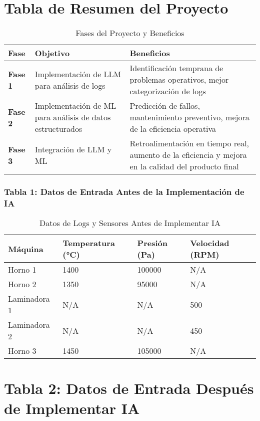 \section{Tabla de Resumen del Proyecto}

\begin{table}[htbp]
\centering
\caption{Fases del Proyecto y Beneficios}
\label{tab:resumen-proyecto}
\begin{tabularx}{\textwidth}{|X|X|X|}
\hline
\textbf{Fase} & \textbf{Objetivo} & \textbf{Beneficios} \\
\hline
\textbf{Fase 1} & Implementación de LLM para análisis de logs & Identificación temprana de problemas operativos, mejor categorización de logs \\
\hline
\textbf{Fase 2} & Implementación de ML para análisis de datos estructurados & Predicción de fallos, mantenimiento preventivo, mejora de la eficiencia operativa \\
\hline
\textbf{Fase 3} & Integración de LLM y ML & Retroalimentación en tiempo real, aumento de la eficiencia y mejora en la calidad del producto final \\
\hline
\end{tabularx}
\end{table}

\subsubsection{Tabla 1: Datos de Entrada Antes de la Implementación de IA}

\begin{table}[htbp]
\centering
\caption{Datos de Logs y Sensores Antes de Implementar IA}
\label{tab:antes-ia}
\begin{tabularx}{\textwidth}{|X|X|X|X|}
\hline
\textbf{Máquina} & \textbf{Temperatura (°C)} & \textbf{Presión (Pa)} & \textbf{Velocidad (RPM)} \\
\hline
Horno 1 & 1400 & 100000 & N/A \\
\hline
Horno 2 & 1350 & 95000 & N/A \\
\hline
Laminadora 1 & N/A & N/A & 500 \\
\hline
Laminadora 2 & N/A & N/A & 450 \\
\hline
Horno 3 & 1450 & 105000 & N/A \\
\hline
\end{tabularx}
\end{table}

\section*{Tabla 2: Datos de Entrada Después de Implementar IA}

